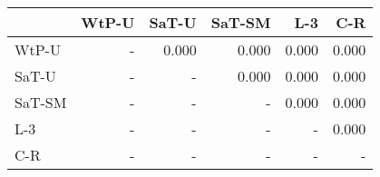 \begin{tabular}{lrrrrr}
\toprule
 & WtP-U & SaT-U & SaT-SM & L-3 & C-R \\
\midrule
WtP-U & - & 0.000 & 0.000 & 0.000 & 0.000 \\
SaT-U & - & - & 0.000 & 0.000 & 0.000 \\
SaT-SM & - & - & - & 0.000 & 0.000 \\
L-3 & - & - & - & - & 0.000 \\
C-R & - & - & - & - & - \\
\bottomrule
\end{tabular}

